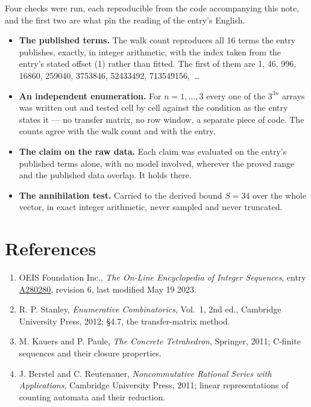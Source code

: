 \documentclass[11pt]{article}
\theoremstyle{definition}
\begin{document}
Four checks were run, each reproducible from the code accompanying this note, and the first two are what pin the reading of the entry's English.

\begin{itemize}

\item {\bfseries The published terms.} The walk count reproduces all 16 terms the entry publishes, exactly, in integer arithmetic, with the index taken from the entry's stated offset (1) rather than fitted. The first of them are 1, 46, 996, 16860, 259040, 3753846, 52433492, 713549156,~\dots

\item {\bfseries An independent enumeration.} For $n = 1,\dots,3$ every one of the $3^{3n}$ arrays was written out and tested cell by cell against the condition as the entry states it --- no transfer matrix, no row window, a separate piece of code. The counts agree with the walk count and with the entry.

\item {\bfseries The claim on the raw data.} Each claim was evaluated on the entry's published terms alone, with no model involved, wherever the proved range and the published data overlap. It holds there.

\item {\bfseries The annihilation test.} Carried to the derived bound $S = 34$ over the whole vector, in exact integer arithmetic, never sampled and never truncated.

\end{itemize}

\section{References}

\begin{enumerate}

\item OEIS Foundation Inc., \emph{The On-Line Encyclopedia of Integer Sequences}, entry \href{https://oeis.org/A280280}{A280280}, revision 6, last modified May 19 2023.

\item R. P. Stanley, \emph{Enumerative Combinatorics}, Vol.~1, 2nd ed., Cambridge University Press, 2012; \S4.7, the transfer-matrix method.

\item M. Kauers and P. Paule, \emph{The Concrete Tetrahedron}, Springer, 2011; C-finite sequences and their closure properties.

\item J. Berstel and C. Reutenauer, \emph{Noncommutative Rational Series with Applications}, Cambridge University Press, 2011; linear representations of counting automata and their reduction.

\end{enumerate}
\end{document}
